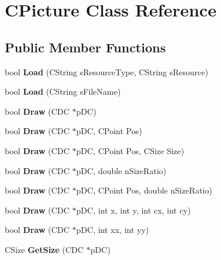 \hypertarget{class_c_picture}{\section{C\-Picture Class Reference}
\label{class_c_picture}
}
\subsection*{Public Member Functions}
\begin{DoxyCompactItemize}
\item 
\hypertarget{class_c_picture_a550ca08ebd0aacff324d022cf81c568c}{bool {\bfseries Load} (C\-String s\-Resource\-Type, C\-String s\-Resource)}\label{class_c_picture_a550ca08ebd0aacff324d022cf81c568c}

\item 
\hypertarget{class_c_picture_a4d385f10db39132cf9a36de835d68e50}{bool {\bfseries Load} (C\-String s\-File\-Name)}\label{class_c_picture_a4d385f10db39132cf9a36de835d68e50}

\item 
\hypertarget{class_c_picture_a70e0fdacd0bd973adb57cd441861f90d}{bool {\bfseries Draw} (C\-D\-C $\ast$p\-D\-C)}\label{class_c_picture_a70e0fdacd0bd973adb57cd441861f90d}

\item 
\hypertarget{class_c_picture_a0c6459cf95ab61407240ba907d03657d}{bool {\bfseries Draw} (C\-D\-C $\ast$p\-D\-C, C\-Point Pos)}\label{class_c_picture_a0c6459cf95ab61407240ba907d03657d}

\item 
\hypertarget{class_c_picture_ac7ae0f9e7b79e4b38869226fe0b634e2}{bool {\bfseries Draw} (C\-D\-C $\ast$p\-D\-C, C\-Point Pos, C\-Size Size)}\label{class_c_picture_ac7ae0f9e7b79e4b38869226fe0b634e2}

\item 
\hypertarget{class_c_picture_a7978d55c12e00514f0b4946ed2cff6f1}{bool {\bfseries Draw} (C\-D\-C $\ast$p\-D\-C, double n\-Size\-Ratio)}\label{class_c_picture_a7978d55c12e00514f0b4946ed2cff6f1}

\item 
\hypertarget{class_c_picture_a6aa5fd40faea939d3593db39c9d97248}{bool {\bfseries Draw} (C\-D\-C $\ast$p\-D\-C, C\-Point Pos, double n\-Size\-Ratio)}\label{class_c_picture_a6aa5fd40faea939d3593db39c9d97248}

\item 
\hypertarget{class_c_picture_aa86d77ee33249ccb2402d1e6d2f2f1b1}{bool {\bfseries Draw} (C\-D\-C $\ast$p\-D\-C, int x, int y, int cx, int cy)}\label{class_c_picture_aa86d77ee33249ccb2402d1e6d2f2f1b1}

\item 
\hypertarget{class_c_picture_a4efb5e692baa0dd3fed129f0ece3001a}{bool {\bfseries Draw} (C\-D\-C $\ast$p\-D\-C, int xx, int yy)}\label{class_c_picture_a4efb5e692baa0dd3fed129f0ece3001a}

\item 
\hypertarget{class_c_picture_ad6fcbce1eb3637e08915ee6e316fea39}{C\-Size {\bfseries Get\-Size} (C\-D\-C $\ast$p\-D\-C)}\label{class_c_picture_ad6fcbce1eb3637e08915ee6e316fea39}

\end{DoxyCompactItemize}
